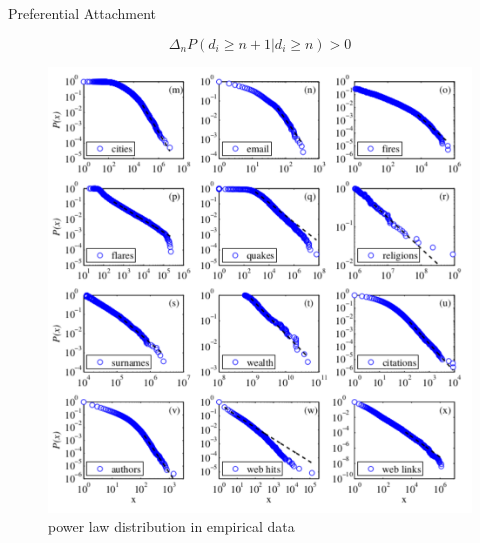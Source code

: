 \begin{frame}[c]{Preferential Attachment}

    \[ \Delta_n P(d_i \geq n+1 | d_i \geq n) > 0 \]

    \begin{figure}[h]
        \caption{power law distribution in empirical data}
    \includegraphics[scale=0.25]{img/power_law.pdf}
    \end{figure}

\end{frame}

